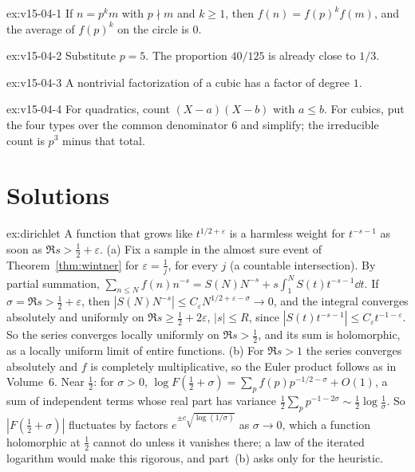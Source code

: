 \begin{hint}{ex:v15-04-1}
If \(n=p^km\) with \(p\nmid m\) and \(k\ge1\), then \(f(n)=f(p)^kf(m)\), and the average of \(f(p)^k\) on the circle is \(0\).
\end{hint}

\begin{hint}{ex:v15-04-2}
Substitute \(p=5\). The proportion \(40/125\) is already close to \(1/3\).
\end{hint}

\begin{hint}{ex:v15-04-3}
A nontrivial factorization of a cubic has a factor of degree \(1\).
\end{hint}

\begin{hint}{ex:v15-04-4}
For quadratics, count \((X-a)(X-b)\) with \(a\le b\). For cubics, put the four types over the common denominator \(6\) and simplify; the irreducible count is \(p^3\) minus that total.
\end{hint}

\section{Solutions}

\begin{solution}{ex:dirichlet}
\idea A function that grows like $t^{1/2+\varepsilon}$ is a harmless weight for $t^{-s-1}$ as soon as $\Re s>\frac12+\varepsilon$.
\writeup (a) Fix a sample in the almost sure event of Theorem~\ref{thm:wintner} for $\varepsilon=\frac1j$, for every $j$ (a countable intersection). By partial summation, $\sum_{n\le N}f(n)n^{-s}=S(N)N^{-s}+s\int_1^NS(t)t^{-s-1}\dd t$. If $\sigma=\Re s>\frac12+\varepsilon$, then $|S(N)N^{-s}|\le C_\varepsilon N^{1/2+\varepsilon-\sigma}\to0$, and the integral converges absolutely and uniformly on $\Re s\ge\frac12+2\varepsilon$, $|s|\le R$, since $|S(t)t^{-s-1}|\le C_\varepsilon t^{-1-\varepsilon}$. So the series converges locally uniformly on $\Re s>\frac12$, and its sum is holomorphic, as a locally uniform limit of entire functions. (b) For $\Re s>1$ the series converges absolutely and $f$ is completely multiplicative, so the Euler product follows as in Volume~6. Near $\frac12$: for $\sigma>0$, $\log F(\frac12+\sigma)=\sum_pf(p)p^{-1/2-\sigma}+O(1)$, a sum of independent terms whose real part has variance $\frac12\sum_pp^{-1-2\sigma}\sim\frac12\log\frac1\sigma$. So $|F(\frac12+\sigma)|$ fluctuates by factors $e^{\pm c\sqrt{\log(1/\sigma)}}$ as $\sigma\to0$, which a function holomorphic at $\frac12$ cannot do unless it vanishes there; a law of the iterated logarithm would make this rigorous, and part~(b) asks only for the heuristic.
\end{solution}

